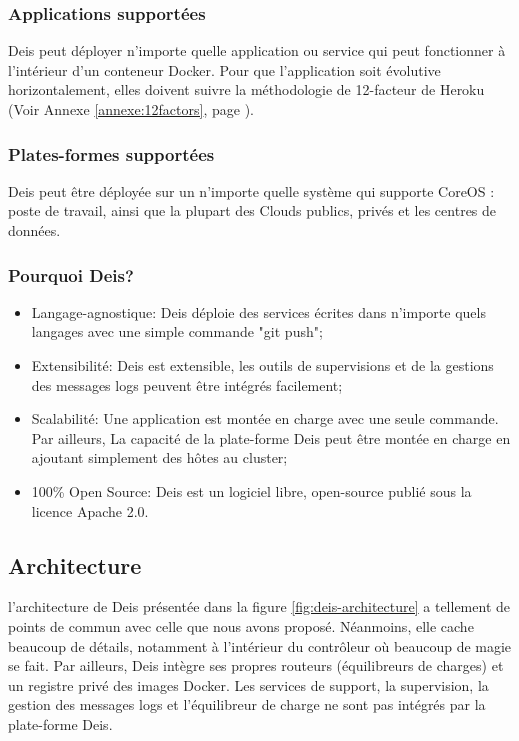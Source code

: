 \begin{onehalfspace}
\subsubsection*{Applications supportées}

Deis peut déployer n'importe quelle application ou service qui peut fonctionner à l'intérieur d'un conteneur Docker. Pour que l'application soit évolutive horizontalement, elles doivent suivre la méthodologie de 12-facteur de Heroku (Voir Annexe \ref{annexe:12factors}, page \pageref{annexe:12factors}).

\subsubsection*{Plates-formes supportées}
Deis peut être déployée sur un n'importe quelle système qui supporte CoreOS : poste de travail, ainsi que la plupart des Clouds publics, privés et les centres de données.


\subsubsection*{Pourquoi Deis?}

\begin{itemize}
	\item Langage-agnostique: Deis déploie des services écrites dans n'importe quels langages avec une simple commande "git push";
	\item Extensibilité: Deis est extensible, les outils de supervisions et de la gestions des messages logs peuvent être intégrés facilement;
	\item Scalabilité: Une application est montée en charge avec une seule commande. Par ailleurs, La capacité de la plate-forme Deis peut être montée en charge en ajoutant simplement des hôtes au cluster;
	\item 100\% Open Source: Deis est un logiciel libre, open-source publié sous la licence Apache 2.0.
\end{itemize}


\subsection{Architecture}

l'architecture de Deis présentée dans la figure \ref{fig:deis-architecture} a tellement de points de commun avec celle que nous avons proposé. Néanmoins, elle cache beaucoup de détails, notamment à l'intérieur du contrôleur où beaucoup de magie se fait. Par ailleurs, Deis intègre ses propres routeurs (équilibreurs de charges) et un registre privé des images Docker. Les services de support, la supervision, la gestion des messages logs et l'équilibreur de charge ne sont pas intégrés par la plate-forme Deis.


\end{onehalfspace}
